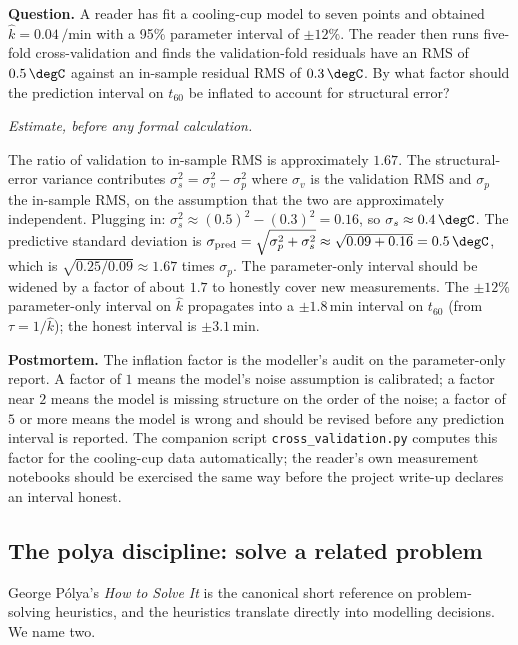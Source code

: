 \begin{estimation}
\textbf{Question.} A reader has fit a cooling-cup model to seven
points and obtained $\hat k = 0.04\,\si{\per\minute}$ with a 95\%
parameter interval of $\pm 12\%$. The reader then runs five-fold
cross-validation and finds the validation-fold residuals have an RMS
of $0.5\,\degC$ against an in-sample residual RMS of
$0.3\,\degC$. By what factor should the prediction interval on
$t_{60}$ be inflated to account for structural error?

\smallskip
\textit{Estimate, before any formal calculation.}

\smallskip
The ratio of validation to in-sample RMS is approximately $1.67$. The
structural-error variance contributes $\sigma_{s}^{2} = \sigma_{v}^{2}
- \sigma_{p}^{2}$ where $\sigma_{v}$ is the validation RMS and
$\sigma_{p}$ the in-sample RMS, on the assumption that the two are
approximately independent. Plugging in: $\sigma_{s}^{2} \approx
(0.5)^{2} - (0.3)^{2} = 0.16$, so $\sigma_{s} \approx 0.4\,\degC$.
The predictive standard deviation is $\sigma_{\text{pred}} =
\sqrt{\sigma_{p}^{2} + \sigma_{s}^{2}} \approx
\sqrt{0.09 + 0.16} = 0.5\,\degC$, which is $\sqrt{0.25/0.09}
\approx 1.67$ times $\sigma_{p}$. The parameter-only interval should
be widened by a factor of about $1.7$ to honestly cover new
measurements. The $\pm 12\%$ parameter-only interval on $\hat k$
propagates into a $\pm 1.8\,\text{min}$ interval on $t_{60}$ (from
$\tau = 1/\hat k$); the honest interval is $\pm 3.1\,\text{min}$.

\smallskip
\textbf{Postmortem.} The inflation factor is the modeller's audit on
the parameter-only report. A factor of $1$ means the model's noise
assumption is calibrated; a factor near $2$ means the model is
missing structure on the order of the noise; a factor of $5$ or
more means the model is wrong and should be revised before any
prediction interval is reported. The companion script
\texttt{cross\_validation.py} computes this factor for the
cooling-cup data automatically; the reader's own measurement
notebooks should be exercised the same way before the project
write-up declares an interval honest.
\end{estimation}

\subsection{The polya discipline: solve a related problem}

George P{\'o}lya's \emph{How to Solve It} \cite{gen:polya1945} is
the canonical short reference on problem-solving heuristics, and
the heuristics translate directly into modelling decisions. We
name two.

